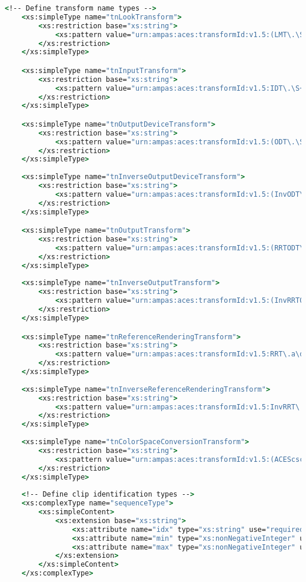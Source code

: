 \begin{lstlisting}[language=csh]
	<!-- Define transform name types -->
	<xs:simpleType name="tnLookTransform">
		<xs:restriction base="xs:string">
			<xs:pattern value="urn:ampas:aces:transformId:v1.5:(LMT\.\S+\.\S+\.a\d+\.v\d+|LMT\.Academy\.\S+\.a\d+\.\d+\.\d+)"/>
		</xs:restriction>
	</xs:simpleType>

	<xs:simpleType name="tnInputTransform">
		<xs:restriction base="xs:string">
			<xs:pattern value="urn:ampas:aces:transformId:v1.5:IDT\.\S+\.\S+\.a\d+\.v\d+"/>
		</xs:restriction>
	</xs:simpleType>

	<xs:simpleType name="tnOutputDeviceTransform">
		<xs:restriction base="xs:string">
			<xs:pattern value="urn:ampas:aces:transformId:v1.5:(ODT\.\S+\.\S+\.a\d+\.v\d+|ODT\.Academy\.\S+\.a\d+\.\d+\.\d+)"/>
		</xs:restriction>
	</xs:simpleType>
	
	<xs:simpleType name="tnInverseOutputDeviceTransform">
		<xs:restriction base="xs:string">
			<xs:pattern value="urn:ampas:aces:transformId:v1.5:(InvODT\.\S+\.\S+\.a\d+\.v\d+|InvODT\.Academy\.\S+\.a\d+\.\d+\.\d+)"/>
		</xs:restriction>
	</xs:simpleType>

	<xs:simpleType name="tnOutputTransform">
		<xs:restriction base="xs:string">
			<xs:pattern value="urn:ampas:aces:transformId:v1.5:(RRTODT\.\S+\.\S+\.a\d+\.v\d+|RRTODT\.Academy\.\S+\.a\d+\.\d+\.\d+)"/>
		</xs:restriction>
	</xs:simpleType>
	
	<xs:simpleType name="tnInverseOutputTransform">
		<xs:restriction base="xs:string">
			<xs:pattern value="urn:ampas:aces:transformId:v1.5:(InvRRTODT\.\S+\.\S+\.a\d+\.v\d+|InvRRTODT\.Academy\.\S+\.a\d+\.\d+\.\d+)"/>
		</xs:restriction>
	</xs:simpleType>

	<xs:simpleType name="tnReferenceRenderingTransform">
		<xs:restriction base="xs:string">
			<xs:pattern value="urn:ampas:aces:transformId:v1.5:RRT\.a\d+\.\d+\.\d+"/>
		</xs:restriction>
	</xs:simpleType>
	
	<xs:simpleType name="tnInverseReferenceRenderingTransform">
		<xs:restriction base="xs:string">
			<xs:pattern value="urn:ampas:aces:transformId:v1.5:InvRRT\.a\d+\.\d+\.\d+"/>
		</xs:restriction>
	</xs:simpleType>
	
	<xs:simpleType name="tnColorSpaceConversionTransform">
		<xs:restriction base="xs:string">
			<xs:pattern value="urn:ampas:aces:transformId:v1.5:(ACEScsc\.\S+\.\S+\.a\d+\.v\d+|ACEScsc\.Academy\.\S+\.a\d+\.\d+\.\d+)"/>
		</xs:restriction>
	</xs:simpleType>
	
	<!-- Define clip identification types -->
	<xs:complexType name="sequenceType">
		<xs:simpleContent>
			<xs:extension base="xs:string">
				<xs:attribute name="idx" type="xs:string" use="required"/>
				<xs:attribute name="min" type="xs:nonNegativeInteger" use="required"/>
				<xs:attribute name="max" type="xs:nonNegativeInteger" use="required"/>
			</xs:extension>
		</xs:simpleContent>
	</xs:complexType>


\end{lstlisting}
